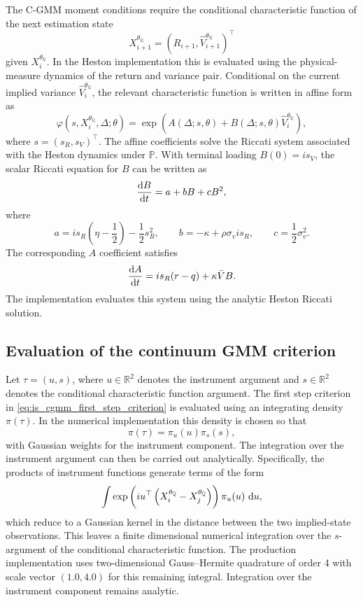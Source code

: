 \documentclass[11pt,a4paper,notitlepage]{article}
\numberwithin{equation}{section}
\begin{document}
The C-GMM moment conditions require the conditional characteristic function of the next estimation state
\[
X_{i+1}^{\theta_{\mathbb Q}}
=
\left(
R_{i+1},
\widehat V_{i+1}^{\theta_{\mathbb Q}}
\right)^\top
\]
given \(X_i^{\theta_{\mathbb Q}}\). In the Heston implementation this is evaluated using the physical-measure dynamics of the return and variance pair. Conditional on the current implied variance \(\widehat V_i^{\theta_{\mathbb Q}}\), the relevant characteristic function is written in affine form as
\[
\varphi\left(s,X_i^{\theta_{\mathbb Q}},\Delta;\theta\right)
=
\exp\left(
A(\Delta;s,\theta)
+
B(\Delta;s,\theta)
\widehat V_i^{\theta_{\mathbb Q}}
\right),
\label{eq:app_heston_transition_ccf}
\]
where \(s=(s_R,s_V)^\top\). The affine coefficients solve the Riccati system associated with the Heston dynamics under \(\mathbb P\). With terminal loading \(B(0)=is_V\), the scalar Riccati equation for \(B\) can be written as
\[
\frac{\dif B}{\dif t}
=
a+bB+cB^2,
\]
where
\[
a
=
is_R\left(\eta-\frac{1}{2}\right)
-\frac{1}{2}s_R^2,
\qquad
b
=
-\kappa+\rho\sigma_v is_R,
\qquad
c
=
\frac{1}{2}\sigma_v^2 .
\]
The corresponding \(A\) coefficient satisfies
\[
\frac{\dif A}{\dif t}
=
is_R(r-q)+\kappa\bar V B .
\]
The implementation evaluates this system using the analytic Heston Riccati solution.

\subsection{Evaluation of the continuum GMM criterion}

Let \(\tau=(u,s)\), where \(u\in\mathbb R^2\) denotes the instrument argument and \(s\in\mathbb R^2\) denotes the conditional characteristic function argument. The first step criterion in \eqref{eq:is_cgmm_first_step_criterion} is evaluated using an integrating density \(\pi(\tau)\). In the numerical implementation this density is chosen so that
\[
\pi(\tau)=\pi_u(u)\pi_s(s),
\]
with Gaussian weights for the instrument component. The integration over the instrument argument can then be carried out analytically. Specifically, the products of instrument functions generate terms of the form
\[
\int
\exp\left(
iu^\top
\left(
X_i^{\theta_{\mathbb Q}}
-
X_j^{\theta_{\mathbb Q}}
\right)
\right)
\pi_u(u)\,\dif u ,
\]
which reduce to a Gaussian kernel in the distance between the two implied-state observations. This leaves a finite dimensional numerical integration over the \(s\)-argument of the conditional characteristic function. The production implementation uses two-dimensional Gauss--Hermite quadrature of order 4 with scale vector $(1.0,4.0)$ for this remaining integral. Integration over the instrument component remains analytic.
\end{document}
